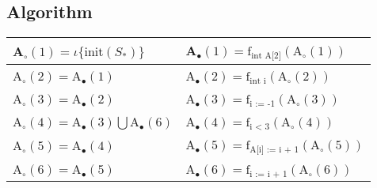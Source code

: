 \subsection{Algorithm}
\begin{table}
\begin{tabular}{| l | l |}
\hline
A$_\circ (1) = \iota \{\text{init}(S_*) \} $ & A$_\bullet(1) = \text{f}_{\text{int A[2]}} (\text{A}_\circ (1))$ \\
\hline
A$_\circ (2) =$A$_\bullet(1) $ & A$_\bullet(2) = \text{f}_{\text{int i}} (\text{A}_\circ (2))$ \\
\hline
A$_\circ (3) = $A$_\bullet(2)$ & A$_\bullet(3) = \text{f}_{\text{i := -1}} (\text{A}_\circ (3))$  \\
\hline
A$_\circ (4) = $A$_\bullet(3) \bigcup $A$_\bullet(6) $ & A$_\bullet(4) = \text{f}_{\text{i < 3}} (\text{A}_\circ (4))$ \\
\hline
A$_\circ (5) = $A$_\bullet(4)$ & A$_\bullet(5) = \text{f}_{\text{A[i] := i + 1}} (\text{A}_\circ (5))$ \\
\hline
A$_\circ (6) = $A$_\bullet(5)$ & A$_\bullet(6) = \text{f}_{\text{i := i + 1}} (\text{A}_\circ (6))$ \\

\hline
\end{tabular}
\centering
\end{table}